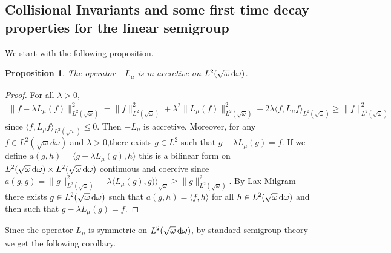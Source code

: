 \documentclass[reqno,11pt,letterpaper]{amsart}
\numberwithin{equation}{section}
\newcommand{\dd}{\, {\rm d}}
\newtheorem{proposition}{Proposition}[section]
\begin{document}
 
\subsection{Collisional Invariants and some first time decay properties for the linear semigroup}

We start with the following proposition.

\begin{proposition}
The operator $-L_\mu$ is m-accretive on $L^2(\sqrt{\omega}\dd \omega)$.  
\end{proposition}

\begin{proof}
For all $\lambda >0$,
\begin{align*}
\| f-\lambda L_\mu (f) \|_{L^2(\sqrt{\omega})}^2=    
\| f \|_{L^2(\sqrt{\omega})}^2+\lambda^2  \| L_\mu(f) \|_{L^2(\sqrt{\omega})}^2-2 \lambda\langle f,L_\mu f\rangle_{L^2(\sqrt{\omega})} \ge \|f\|_{L^2(\sqrt{\omega})}^2
\end{align*}
since $\langle f, L_\mu f\rangle_{L^2(\sqrt{\omega})}\leq 0$.
Then $-L_\mu$ is accretive. Moreover, for any $f\in L^2(\sqrt \omega d\omega )$ and $\lambda>0$,there exists $g\in L^2$ such that $g-\lambda L_\mu(g)=f$. If we define $a(g, h)=\langle g-\lambda L_\mu(g), h\rangle $ this is a bilinear form on 
$ L^2(\sqrt \omega \dd\omega )\times L^2(\sqrt \omega \dd\omega )$ continuous and coercive since 
$a(g, g)=\|g\|_{L^2(\sqrt{\omega})}^2-\lambda \langle L_\mu(g), g)\rangle_{\sqrt{\omega}} \ge \|g\|_{L^2(\sqrt{\omega})}^2$. By Lax-Milgram there exists $g\in L^2(\sqrt{\omega} \dd \omega)$ such that $a(g, h)=\langle f, h\rangle$ for all $h\in L^2(\sqrt{\omega} \dd \omega)$ and then such that $g-\lambda L_\mu(g)=f$.
\end{proof}
Since the operator $L_\mu$ is symmetric on $L^2(\sqrt{\omega} \dd \omega)$, by standard semigroup theory we get the following corollary. 
\end{document}
